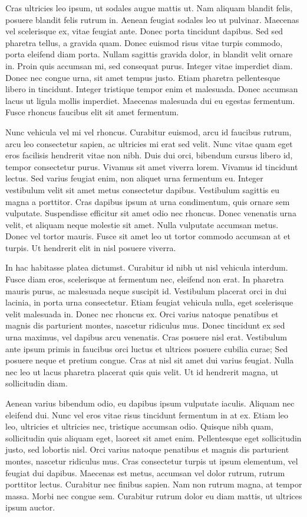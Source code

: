 Cras ultricies leo ipsum, ut sodales augue mattis ut. Nam aliquam blandit felis, posuere blandit felis rutrum in. Aenean feugiat sodales leo ut pulvinar. Maecenas vel scelerisque ex, vitae feugiat ante. Donec porta tincidunt dapibus. Sed sed pharetra tellus, a gravida quam. Donec euismod risus vitae turpis commodo, porta eleifend diam porta. Nullam sagittis gravida dolor, in blandit velit ornare in. Proin quis accumsan mi, sed consequat purus. Integer vitae imperdiet diam. Donec nec congue urna, sit amet tempus justo. Etiam pharetra pellentesque libero in tincidunt. Integer tristique tempor enim et malesuada. Donec accumsan lacus ut ligula mollis imperdiet. Maecenas malesuada dui eu egestas fermentum. Fusce rhoncus faucibus elit sit amet fermentum.

Nunc vehicula vel mi vel rhoncus. Curabitur euismod, arcu id faucibus rutrum, arcu leo consectetur sapien, ac ultricies mi erat sed velit. Nunc vitae quam eget eros facilisis hendrerit vitae non nibh. Duis dui orci, bibendum cursus libero id, tempor consectetur purus. Vivamus sit amet viverra lorem. Vivamus id tincidunt lectus. Sed varius feugiat enim, non aliquet urna fermentum eu. Integer vestibulum velit sit amet metus consectetur dapibus. Vestibulum sagittis eu magna a porttitor. Cras dapibus ipsum at urna condimentum, quis ornare sem vulputate. Suspendisse efficitur sit amet odio nec rhoncus. Donec venenatis urna velit, et aliquam neque molestie sit amet. Nulla vulputate accumsan metus. Donec vel tortor mauris. Fusce sit amet leo ut tortor commodo accumsan at et turpis. Ut hendrerit elit in nisl posuere viverra.

In hac habitasse platea dictumst. Curabitur id nibh ut nisl vehicula interdum. Fusce diam eros, scelerisque at fermentum nec, eleifend non erat. In pharetra mauris purus, ac malesuada neque suscipit id. Vestibulum placerat orci in dui lacinia, in porta urna consectetur. Etiam feugiat vehicula nulla, eget scelerisque velit malesuada in. Donec nec rhoncus ex. Orci varius natoque penatibus et magnis dis parturient montes, nascetur ridiculus mus. Donec tincidunt ex sed urna maximus, vel dapibus arcu venenatis. Cras posuere nisl erat. Vestibulum ante ipsum primis in faucibus orci luctus et ultrices posuere cubilia curae; Sed posuere neque et pretium congue. Cras at nisl sit amet dui varius feugiat. Nulla nec leo ut lacus pharetra placerat quis quis velit. Ut id hendrerit magna, ut sollicitudin diam.

Aenean varius bibendum odio, eu dapibus ipsum vulputate iaculis. Aliquam nec eleifend dui. Nunc vel eros vitae risus tincidunt fermentum in at ex. Etiam leo leo, ultricies et ultricies nec, tristique accumsan odio. Quisque nibh quam, sollicitudin quis aliquam eget, laoreet sit amet enim. Pellentesque eget sollicitudin justo, sed lobortis nisl. Orci varius natoque penatibus et magnis dis parturient montes, nascetur ridiculus mus. Cras consectetur turpis ut ipsum elementum, vel feugiat dui dapibus. Maecenas est metus, accumsan vel dolor rutrum, rutrum porttitor lectus. Curabitur nec finibus sapien. Nam non rutrum magna, at tempor massa. Morbi nec congue sem. Curabitur rutrum dolor eu diam mattis, ut ultrices ipsum auctor.
